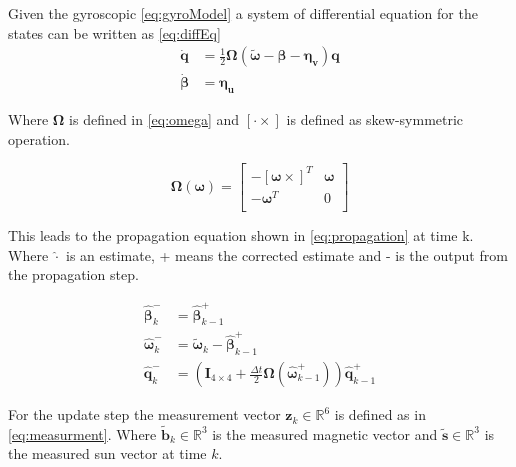 Given the gyroscopic \autoref{eq:gyroModel} a system of differential equation for the states can be written as \autoref{eq:diffEq}  
\begin{subequations}\label{eq:diffEq}
\begin{align}
	\boldsymbol{\dot{q}} &= \frac{1}{2}\boldsymbol{\Omega}(\tilde{\boldsymbol{\omega}} - \boldsymbol{\beta} - \boldsymbol{\eta_v})\boldsymbol{q}\label{eq:diffQuaternion}\\
	\boldsymbol{\dot{\beta}} &= \boldsymbol{\eta_u}
\end{align} 
\end{subequations}

Where $\boldsymbol{\Omega}$ is defined in \autoref{eq:omega} and $[\cdot\times]$ is defined as skew-symmetric operation. 

\begin{equation}\label{eq:omega}
	\boldsymbol{\Omega}(\boldsymbol{\omega}) = \begin{bmatrix}
		-[\boldsymbol{\omega}\times]^T & \boldsymbol{\omega} \\
		-\boldsymbol{\omega}^T & 0 \\ 
		\end{bmatrix}
\end{equation} 

This leads to the propagation equation shown in \autoref{eq:propagation} at time k. Where $\hat{\cdot}$ is an estimate, + means the corrected estimate and - is the output from the propagation step. 

\begin{subequations}\label{eq:propagation}
\begin{align}
	\hat{\boldsymbol{\beta}}^-_k &= \hat{\boldsymbol{\beta}}^+_{k-1} \\
	\hat{\boldsymbol{\omega}}^-_k &= \tilde{\boldsymbol{\omega}}_k-\hat{\boldsymbol{\beta}}^+_{k-1} \\
	\hat{\boldsymbol{q}}^-_k &= (\boldsymbol{I}_{4\times4} + \frac{\Delta t}{2}\boldsymbol{\Omega}(\hat{\boldsymbol{\omega}}^+_{k-1}))\hat{\boldsymbol{q}}^+_{k-1}
\end{align}
\end{subequations}

For the update step the measurement vector $\boldsymbol{z}_k \in \mathbb{R}^{6}$ is defined as in \autoref{eq:measurment}. Where $\tilde{\boldsymbol{b}}_k \in \mathbb{R}^{3}$ is the measured magnetic vector and $\tilde{\boldsymbol{s}} \in \mathbb{R}^{3}$ is the measured sun vector at time $k$. 

